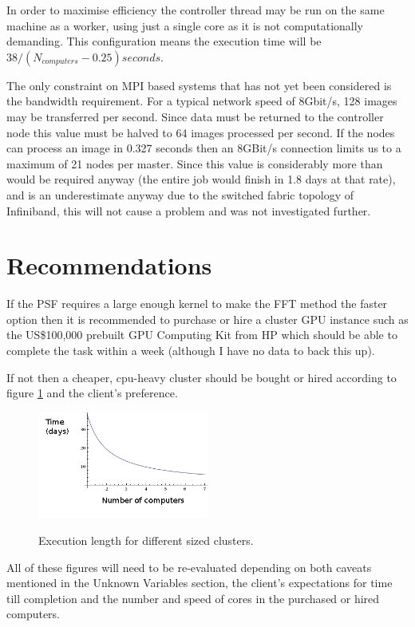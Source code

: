 \documentclass{article}
\begin{document}
In order to maximise efficiency the controller thread may be run on the same machine as a
worker, using just a single core as it is not computationally demanding. This
configuration means the execution time will be $38/(N_{computers}-0.25)seconds$.

The only constraint on MPI based systems that has not yet been considered is the
bandwidth requirement. For a typical network speed of 8Gbit/s, 128 images may be
transferred per second. Since data must be returned to the controller node this
value must be halved to 64 images processed per second. If the nodes can process
an image in 0.327 seconds then an 8GBit/s connection limits us to a maximum of
21 nodes per master. Since this value is considerably more than would be required anyway (the
entire job would finish in 1.8 days at that rate), and is an underestimate
anyway due to the switched fabric topology of Infiniband, this will not cause a
problem and was not investigated further.

\section{Recommendations}
If the PSF requires a large enough kernel to make the FFT method the faster
option then it is recommended to purchase or hire a cluster GPU instance such as
the US\$100,000 prebuilt GPU Computing Kit from HP which should be able to complete
the task within a week (although I have no data to back this up).

If not then a cheaper, cpu-heavy cluster should be bought or hired according to
figure \ref{comps-vs-time} and the client's preference.

\begin{figure}[h!]
\caption{Execution length for different sized clusters.}
\centering
\includegraphics[width=0.5\textwidth]{comps-vs-time}
\label{comps-vs-time}
\end{figure}

All of these figures will need to be re-evaluated depending on both caveats
mentioned in the Unknown Variables section, the client's expectations for
time till completion and the number and speed of cores in the purchased or hired
computers.
\end{document}
